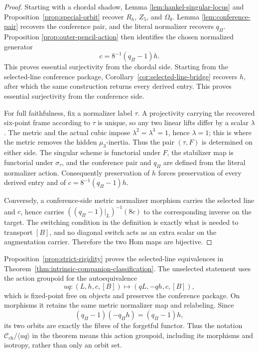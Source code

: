 \documentclass[11pt]{article}
\theoremstyle{definition}
\theoremstyle{remark}
\newcommand{\cC}{\mathscr C}
\begin{document}
\begin{proof}
Starting with a chordal shadow, Lemma
\ref{lem:hankel-singular-locus} and Proposition~\ref{prop:special-orbit}
recover \(R_h\), \(Z_5\), and \(\Omega_0\).  Lemma
\ref{lem:conference-pair} recovers the conference pair, and
the literal normalizer recovers \(q_\Pi\).  Proposition
\ref{prop:outer-pencil-action} then identifies the chosen normalized generator
\[
                      c=8^{-1}(q_\Pi-1)h.
\]
This proves essential surjectivity from the chordal side.  Starting from the
selected-line conference package, Corollary~\ref{cor:selected-line-bridge}
recovers \(h\), after which the same construction returns every derived
entry.  This proves essential surjectivity from the conference side.

For full faithfulness, fix a normalizer label \(\tau\).  A projectivity
carrying the recovered six-point frame according to \(\tau\) is unique, so
any two linear lifts differ by a scalar \(\lambda\).  The metric and the
actual cubic impose \(\lambda^2=\lambda^3=1\), hence \(\lambda=1\); this is
where the metric removes the hidden \(\mu_3\)-inertia.  Thus the pair
\((\tau,F)\) is determined on either side.  The singular scheme is functorial
under \(F\), the stabilizer map is functorial under \(\sigma_\tau\), and the
conference pair and \(q_\Pi\) are defined from the literal normalizer action.
Consequently preservation of \(h\) forces preservation of every derived
entry and of \(c=8^{-1}(q_\Pi-1)h\).

Conversely, a conference-side metric normalizer morphism carries the selected
line and \(c\), hence carries
\(((q_\Pi-1)|_L)^{-1}(8c)\) to the corresponding inverse on the target.
The switching condition in the definition is exactly what is needed to
transport \([B]\), and no diagonal switch acts as an extra scalar on the
augmentation carrier.  Therefore the two Hom maps are bijective.
\end{proof}

Proposition~\ref{prop:strict-rigidity} proves the selected-line equivalences
in Theorem~\ref{thm:intrinsic-companion-classification}.  The unselected
statement uses the action groupoid for the autoequivalence
\[
             uq:(L,h,c,[B])\longmapsto(qL,-qh,c,[B]),
\]
which is fixed-point free on objects and preserves the conference package.
On morphisms it retains the same metric normalizer map and relabeling.  Since
\[
                  (q_\Pi-1)(-q_\Pi h)=(q_\Pi-1)h,
\]
its two orbits are exactly the fibres of the forgetful functor.  Thus the
notation \(\cC_{\mathrm{ch}}/\langle uq\rangle\) in the theorem means this
action groupoid, including its morphisms and isotropy, rather than only an
orbit set.
\end{document}
